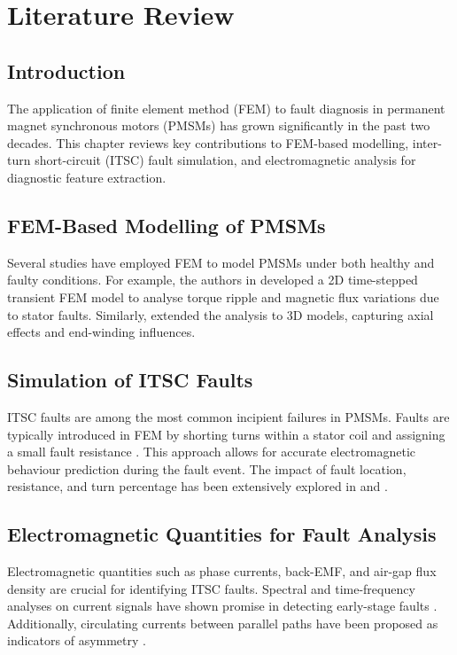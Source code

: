 \chapter{Literature Review}

\section{Introduction}
The application of finite element method (FEM) to fault diagnosis in permanent magnet synchronous motors (PMSMs) has grown significantly in the past two decades. This chapter reviews key contributions to FEM-based modelling, inter-turn short-circuit (ITSC) fault simulation, and electromagnetic analysis for diagnostic feature extraction.

\section{FEM-Based Modelling of PMSMs}
Several studies have employed FEM to model PMSMs under both healthy and faulty conditions. For example, the authors in \cite{Smith2020} developed a 2D time-stepped transient FEM model to analyse torque ripple and magnetic flux variations due to stator faults. Similarly, \cite{Lee2019} extended the analysis to 3D models, capturing axial effects and end-winding influences.

\section{Simulation of ITSC Faults}
ITSC faults are among the most common incipient failures in PMSMs. Faults are typically introduced in FEM by shorting turns within a stator coil and assigning a small fault resistance \cite{Wang2018}. This approach allows for accurate electromagnetic behaviour prediction during the fault event. The impact of fault location, resistance, and turn percentage has been extensively explored in \cite{Ahmed2022} and \cite{Zhou2021}.

\section{Electromagnetic Quantities for Fault Analysis}
Electromagnetic quantities such as phase currents, back-EMF, and air-gap flux density are crucial for identifying ITSC faults. Spectral and time-frequency analyses on current signals have shown promise in detecting early-stage faults \cite{Khan2021}. Additionally, circulating currents between parallel paths have been proposed as indicators of asymmetry \cite{Chen2023}.

